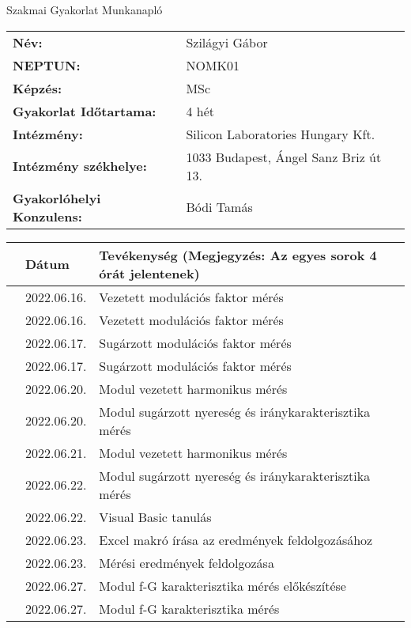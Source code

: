 \documentclass[10pt,a4paper,oneside]{report}
\newcounter{magicrownumbers}
\newcommand\rownum{\stepcounter{magicrownumbers}\arabic{magicrownumbers}}
\begin{document}
\begin{center}
	\Large{Szakmai Gyakorlat Munkanapló}
\end{center}
\begin{tabular}{p{} p{}}
	\textbf{Név:} & Szilágyi Gábor \\
	\textbf{NEPTUN:} & NOMK01 \\
	\textbf{Képzés:} & MSc \\
	\textbf{Gyakorlat Időtartama:} & 4 hét\\
	\textbf{Intézmény:} & Silicon Laboratories Hungary Kft.\\
	\textbf{Intézmény székhelye:} & 1033 Budapest, Ángel Sanz Briz út 13. \\
	\textbf{Gyakorlóhelyi Konzulens:} & Bódi Tamás
\end{tabular}
\begin{table}[h!]
	\centering
	\small
	\begin{tabular}{| c | p{3 cm} | p{10 cm} |}
	\hline
	 & Dátum & Tevékenység (Megjegyzés: Az egyes sorok 4 órát jelentenek) \\ \hline \hline
	\rownum & 2022.06.16. & Vezetett modulációs faktor mérés \\ \hline
	\rownum & 2022.06.16. & Vezetett modulációs faktor mérés \\ \hline
	\rownum & 2022.06.17. & Sugárzott modulációs faktor mérés \\ \hline
	\rownum & 2022.06.17. & Sugárzott modulációs faktor mérés \\ \hline
	\rownum & 2022.06.20. & Modul vezetett harmonikus mérés \\ \hline
	\rownum & 2022.06.20. & Modul sugárzott nyereség és iránykarakterisztika mérés  \\ \hline
	\rownum & 2022.06.21. & Modul vezetett harmonikus mérés \\ \hline
	\rownum & 2022.06.22. & Modul sugárzott nyereség és iránykarakterisztika mérés \\ \hline
	\rownum & 2022.06.22. & Visual Basic tanulás \\ \hline
	\rownum & 2022.06.23. & Excel makró írása az eredmények feldolgozásához \\ \hline
	\rownum & 2022.06.23. & Mérési eredmények feldolgozása \\ \hline
	\rownum & 2022.06.27. & Modul f-G karakterisztika mérés előkészítése \\ \hline
	\rownum & 2022.06.27. & Modul f-G karakterisztika mérés \\ \hline

\end{tabular}
\end{table}
\end{document}
